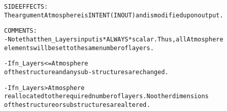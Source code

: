 \begin{alltt}
  SIDE EFFECTS:
        The argument Atmosphere is INTENT(IN OUT) and is modified upon output.
 
  COMMENTS:
        - Note that the n_Layers input is *ALWAYS* scalar. Thus, all Atmosphere
          elements will be set to the same number of layers.
 
        - If n_Layers <= Atmosphere%Max_Layers, then only the dimension value
          of the structure and any sub-structures are changed.
 
        - If n_Layers > Atmosphere%Max_Layers, then the entire structure is
          reallocated to the required number of layers. No other dimensions
          of the structure or substructures are altered.
 
  \end{alltt}
